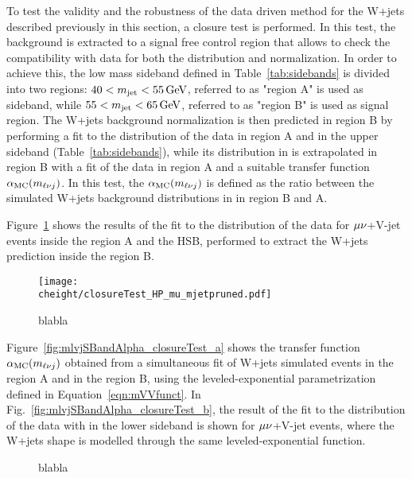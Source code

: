 To test the validity and the robustness of the data driven method for the W+jets described previously in this section, a closure test is performed.
In this test, the background is extracted to a signal free control region that allows to check the compatibility with data for both the distribution and normalization.
In order to achieve this, the low mass sideband defined in Table~\ref{tab:sidebands} is divided into two regions:
$40 < m_{\text{jet}} < 55\,\text{Ge\hspace{-.08em}V}$, referred to as "region A" is used as sideband, while $55 < m_{\text{jet}} < 65\,\text{Ge\hspace{-.08em}V}$, referred to as "region B" is used as signal region.
The W+jets background normalization is then predicted in region B by performing a fit to the \mJ distribution of the data in region A and in the upper sideband (Table~\ref{tab:sidebands}),
while its distribution in \mlvj is extrapolated in region B with a fit of the data in region A and a suitable transfer function $\alpha_\mathrm{MC}(m_{\ell\nu j})$.
In this test, the $\alpha_\mathrm{MC}(m_{\ell\nu j})$ is defined as the ratio between the simulated W+jets background distributions in \mlvj in region B and A.

Figure~\ref{fig:mj_closureTest} shows the results of the fit to the \mJ distribution of the data for $\mu\nu$+V-jet events inside the region A and the HSB, performed to extract the W+jets prediction inside the region B.

\begin{figure}[!htb]
\centering
\texttt{[image: \\cheight/closureTest\_HP\_mu\_mjetpruned.pdf]}
\caption{blabla}
\label{fig:mj_closureTest}
\end{figure}

Figure~\ref{fig:mlvjSBandAlpha_closureTest_a} shows the transfer function $\alpha_\mathrm{MC}(m_{\ell\nu j})$ obtained from a simultaneous fit of W+jets simulated events in the region A and in the region B, using the leveled-exponential parametrization defined in Equation~\ref{eqn:mVVfunct}. In Fig.~\ref{fig:mlvjSBandAlpha_closureTest_b}, the result of the fit to the \mlvj distribution of the data with \mJ in the lower sideband is shown for $\mu\nu$+V-jet events, where the W+jets shape is modelled through the same leveled-exponential function.

\begin{figure}[!htb]
\centering
{}
\caption{blabla}
\label{fig:mlvjSBandAlpha_closureTest}
\end{figure}

